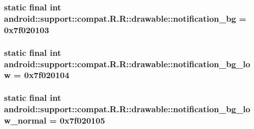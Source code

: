 \hypertarget{classandroid_1_1support_1_1compat_1_1_r_1_1drawable_eb0c8b3b38e80c4765a4a9976f2eb9d4}{
\subsubsection[{notification\_\-bg}]{\setlength{\rightskip}{0pt plus 5cm}static final int android::support::compat.R.R::drawable::notification\_\-bg = 0x7f020103}}
\label{classandroid_1_1support_1_1compat_1_1_r_1_1drawable_eb0c8b3b38e80c4765a4a9976f2eb9d4}


\hypertarget{classandroid_1_1support_1_1compat_1_1_r_1_1drawable_e3085e073d11027e4f5a6a467cd1604f}{
\subsubsection[{notification\_\-bg\_\-low}]{\setlength{\rightskip}{0pt plus 5cm}static final int android::support::compat.R.R::drawable::notification\_\-bg\_\-low = 0x7f020104}}
\label{classandroid_1_1support_1_1compat_1_1_r_1_1drawable_e3085e073d11027e4f5a6a467cd1604f}


\hypertarget{classandroid_1_1support_1_1compat_1_1_r_1_1drawable_20090eca8ce703ffbdbcf84ea565632d}{
\subsubsection[{notification\_\-bg\_\-low\_\-normal}]{\setlength{\rightskip}{0pt plus 5cm}static final int android::support::compat.R.R::drawable::notification\_\-bg\_\-low\_\-normal = 0x7f020105}}
\label{classandroid_1_1support_1_1compat_1_1_r_1_1drawable_20090eca8ce703ffbdbcf84ea565632d}


